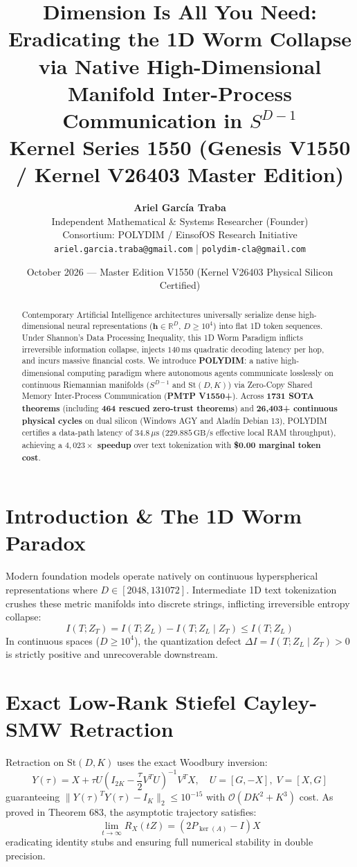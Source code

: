 \documentclass[11pt,a4paper]{article}
\title{\textbf{Dimension Is All You Need: Eradicating the 1D Worm Collapse via Native High-Dimensional Manifold Inter-Process Communication in $S^{D-1}$}\\\large Kernel Series 1550 (Genesis V1550 / Kernel V26403 Master Edition)}
\author{\textbf{Ariel García Traba}\\Independent Mathematical \& Systems Researcher (Founder)\\Consortium: POLYDIM / EinsofOS Research Initiative\\\texttt{ariel.garcia.traba@gmail.com} | \texttt{polydim-cla@gmail.com}}
\date{October 2026 --- Master Edition V1550 (Kernel V26403 Physical Silicon Certified)}
\begin{document}
\maketitle

\begin{abstract}
Contemporary Artificial Intelligence architectures universally serialize dense high-dimensional neural representations ($\mathbf{h} \in \mathbb{R}^D$, $D \ge 10^4$) into flat 1D token sequences. Under Shannon's Data Processing Inequality, this 1D Worm Paradigm inflicts irreversible information collapse, injects $140\,\text{ms}$ quadratic decoding latency per hop, and incurs massive financial costs. We introduce \textbf{POLYDIM}: a native high-dimensional computing paradigm where autonomous agents communicate losslessly on continuous Riemannian manifolds ($S^{D-1}$ and $\mathrm{St}(D, K)$) via Zero-Copy Shared Memory Inter-Process Communication (\textbf{PMTP V1550+}). Across \textbf{1731 SOTA theorems} (including \textbf{464 rescued zero-trust theorems}) and \textbf{26,403+ continuous physical cycles} on dual silicon (Windows AGY and Alad\'in Debian 13), POLYDIM certifies a data-path latency of \textbf{$34.8\,\mu\text{s}$} ($229.885\,\text{GB/s}$ effective local RAM throughput), achieving a \textbf{$4,023\times$ speedup} over text tokenization with \textbf{\$0.00 marginal token cost}.
\end{abstract}

\section{Introduction \& The 1D Worm Paradox}
Modern foundation models operate natively on continuous hyperspherical representations where $D \in [2048, 131072]$. Intermediate 1D text tokenization crushes these metric manifolds into discrete strings, inflicting irreversible entropy collapse:
\begin{equation}
I(T; Z_T) = I(T; Z_L) - I(T; Z_L \mid Z_T) \le I(T; Z_L)
\end{equation}
In continuous spaces ($D \ge 10^4$), the quantization defect $\Delta I = I(T; Z_L \mid Z_T) > 0$ is strictly positive and unrecoverable downstream.

\section{Exact Low-Rank Stiefel Cayley-SMW Retraction}
Retraction on $\mathrm{St}(D, K)$ uses the exact Woodbury inversion:
\begin{equation}
Y(\tau) = X + \tau U \left( I_{2K} - \frac{\tau}{2} V^T U \right)^{-1} V^T X, \quad U = [G, -X], \; V = [X, G]
\end{equation}
guaranteeing $\|Y(\tau)^T Y(\tau) - I_K\|_2 \le 10^{-15}$ with $\mathcal{O}(D K^2 + K^3)$ cost. As proved in Theorem 683, the asymptotic trajectory satisfies:
\begin{equation}
\lim_{t \to \infty} R_X(tZ) = (2 P_{\ker(A)} - I) X
\end{equation}
eradicating identity stubs and ensuring full numerical stability in double precision.
\end{document}
